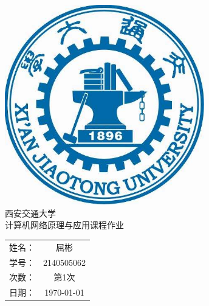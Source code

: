 \begin{titlepage}
	\begin{center}
		\includegraphics[width=0.65\textwidth]{image/XJTU}\\[1cm]    
		\textsc{\LARGE 西安交通大学}\\[0.5cm]
		\textsc{\Large 计算机网络原理与应用课程作业}\\[0.5cm]
		\begin{tabular}{cc}%
			姓名：&屈彬\\%
			学号：&2140505062\\%
			次数：&第1次\\
			日期：&\today\\
		\end{tabular}
	\end{center}
\end{titlepage}